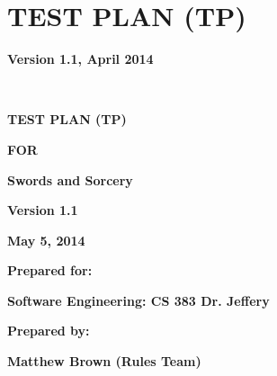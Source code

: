\chapter{TEST PLAN (TP)}

{\centering{}\bfseries\color{black}
Version 1.1, April 2014
\par}

\ 

\bigskip

{\centering\bfseries\color{black}
TEST PLAN (TP)}

{\centering{}\bfseries\color{black}
FOR
\par}


\bigskip

{\centering{}\bfseries\color{black}
Swords and Sorcery
\par}


\bigskip


\bigskip


\bigskip


\bigskip


\bigskip


\bigskip


\bigskip

{\centering{}\bfseries\color{black}
Version 1.1
\par}

{\centering{}\bfseries\color{black}
May 5, 2014
\par}


\bigskip


\bigskip

{\centering{}\bfseries\color{black}
Prepared for:
\par}

{\centering{}\bfseries\color{black}
Software Engineering: CS 383
Dr. Jeffery
\par}


\bigskip


\bigskip

{\centering{}\bfseries\color{black}
Prepared by:
\par}

{\centering{}\bfseries\color{black}
Matthew Brown (Rules Team)
\par}

